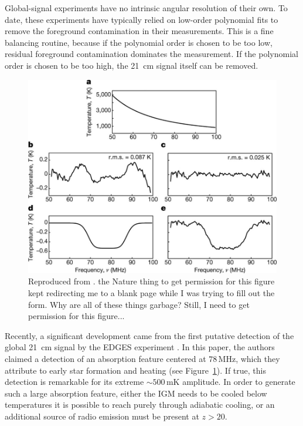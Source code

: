 \begin{bibunit}
Global-signal experiments have no intrinsic angular resolution of their own. To date, these
experiments have typically relied on low-order polynomial fits to remove the foreground
contamination in their measurements. This is a fine balancing routine, because if the polynomial
order is chosen to be too low, residual foreground contamination dominates the measurement. If the
polynomial order is chosen to be too high, the 21~cm signal itself can be removed.

\begin{figure}[t]
    \centering
    \includegraphics[width=\textwidth]{figures/chapter1/bowman-2018-absorption-trough}
    \caption{
        Reproduced from \citet{2018Natur.555...67B}.
        the Nature thing to get permission for this figure kept redirecting me to a blank page while
        I was trying to fill out the form. Why are all of these things garbage? Still, I need to get
        permission for this figure...
    }
    \label{fig:bowman-absorption-trough}
\end{figure}

Recently, a significant development came from the first putative detection of the global 21~cm
signal by the EDGES experiment \citep{2018Natur.555...67B}. In this paper, the authors claimed a
detection of an absorption feature centered at $78\,\text{MHz}$, which they attribute to early star
formation and heating (see Figure~\ref{fig:bowman-absorption-trough}). If true, this detection is
remarkable for its extreme $\sim500\,\text{mK}$ amplitude. In order to generate such a large
absorption feature, either the IGM needs to be cooled below temperatures it is possible to reach
purely through adiabatic cooling, or an additional source of radio emission must be present at $z >
20$.


\end{bibunit}

